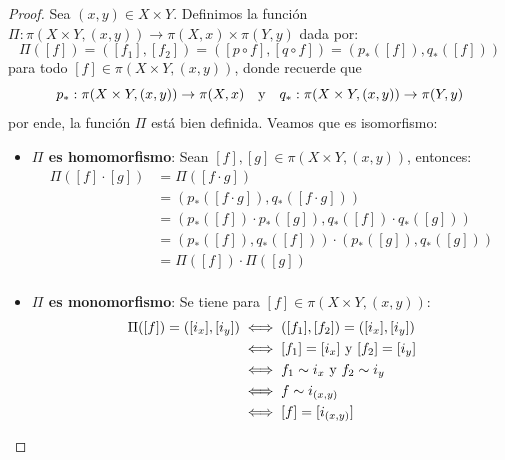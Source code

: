 \documentclass[12pt]{report}
\theoremstyle{largebreak}
\newcommand\cf[3]{\ensuremath{#1:#2\rightarrow#3}}
\begin{document}
    \begin{proof}
        Sea $(x,y)\in X\times Y$. Definimos la función $\cf{\Pi}{\pi(X\times Y,(x,y))}{\pi(X,x)\times\pi(Y,y)}$ dada por:
        \begin{equation*}
            \Pi([f])=([f_1],[f_2])=([p\circ f],[q\circ f])=(p_*([f]),q_*([f]))
        \end{equation*}
        para todo $[f]\in\pi(X\times Y,(x,y))$, donde recuerde que
        \begin{equation*}
            \cf{p_*}{\pi(X\times Y,(x,y))}{\pi(X,x)}\quad\textup{y}\quad\cf{q_*}{\pi(X\times Y,(x,y))}{\pi(Y,y)}
        \end{equation*}
        por ende, la función $\Pi$ está bien definida. Veamos que es isomorfismo:
        \begin{itemize}
            \item \textbf{$\Pi$ es homomorfismo}: Sean $[f],[g]\in\pi(X\times Y,(x,y))$, entonces:
            \begin{equation*}
                \begin{split}
                    \Pi([f]\cdot[g])&=\Pi([f\cdot g])\\
                    &=(p_*([f\cdot g]),q_*([f\cdot g]))\\
                    &=(p_*([f])\cdot p_*([g]),q_*([f])\cdot q_*([g]))\\
                    &=(p_*([f]),q_*([f]))\cdot(p_*([g]),q_*([g]))\\
                    &=\Pi([f])\cdot\Pi([g])\\
                \end{split}
            \end{equation*}
            \item \textbf{$\Pi$ es monomorfismo}: Se tiene para $[f]\in\pi(X\times Y,(x,y))$:
            \begin{equation*}
                \begin{split}
                    \Pi([f])=([i_x],[i_y])&\iff ([f_1],[f_2])=([i_x],[i_y])\\
                    &\iff [f_1]=[i_x]\textup{ y }[f_2]=[i_y]\\
                    &\iff f_1\sim i_x\textup{ y }f_2\sim i_y\\
                    &\iff f\sim i_{(x,y)}\\
                    &\iff [f]=[i_{(x,y)}]\\
                \end{split}
            \end{equation*}

\end{itemize}
\end{proof}
\end{document}
